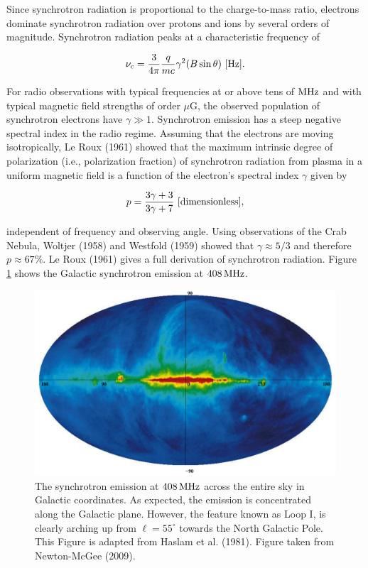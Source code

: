 \documentclass[a4paper,10pt]{article}
\begin{document}
{\noindent}Since synchrotron radiation is proportional to the charge-to-mass ratio, electrons dominate synchrotron radiation over protons and ions by several orders of magnitude. Synchrotron radiation peaks at a characteristic frequency of

\begin{align*}
    \nu_c = \dfrac{3}{4\pi}\dfrac{q}{mc}\gamma^2(B\sin\theta)~[{\rm Hz}].
\end{align*}

{\noindent}For radio observations with typical frequencies at or above tens of ${\rm MHz}$ and with typical magnetic field strengths of order $\mu$G, the observed population of synchrotron electrons have $\gamma\gg1$. Synchrotron emission has a steep negative spectral index in the radio regime. Assuming that the electrons are moving isotropically, Le Roux (1961) showed that the maximum intrinsic degree of polarization (i.e., polarization fraction) of synchrotron radiation from plasma in a uniform magnetic field is a function of the electron's spectral index $\gamma$ given by

\begin{align*}
    p = \frac{3\gamma + 3}{3\gamma+7} ~ [{\rm dimensionless}],
\end{align*}

{\noindent}independent of frequency and observing angle. Using observations of the Crab Nebula, Woltjer (1958) and Westfold (1959) showed that $\gamma\approx5/3$ and therefore $p\approx67\%$. Le Roux (1961) gives a full derivation of synchrotron radiation. Figure \ref{figure:408mhz} shows the Galactic synchrotron emission at $408\,{\rm MHz}$.

\begin{figure}[h]
\begin{center}
\includegraphics[width=15cm]{figures/408MHz.png}
\caption{\footnotesize{The synchrotron emission at $408\,{\rm MHz}$ across the entire sky in Galactic coordinates. As expected, the emission is concentrated along the Galactic plane. However, the feature known as Loop I, is clearly arching up from $\ell=55^\circ$ towards the North Galactic Pole. This Figure is adapted from Haslam et al. (1981). Figure taken from Newton-McGee (2009).}}
\label{figure:408mhz}
\end{center}
\end{figure}
\end{document}
